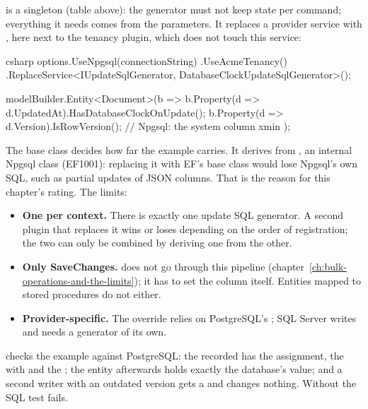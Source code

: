  is a singleton (table above): the
generator must not keep state per command; everything it needs comes from the parameters. It
replaces a provider service with , here next to the tenancy
plugin, which does not touch this service:

\begin{sourcecode}[Registration]{csharp}
options.UseNpgsql(connectionString)
    .UseAcmeTenancy()
    .ReplaceService<IUpdateSqlGenerator, DatabaseClockUpdateSqlGenerator>();

modelBuilder.Entity<Document>(b =>
{
    b.Property(d => d.UpdatedAt).HasDatabaseClockOnUpdate();
    b.Property(d => d.Version).IsRowVersion();            // Npgsql: the system column xmin
});
\end{sourcecode}

The base class decides how far the example carries. It derives from
, an internal Npgsql
class (EF1001): replacing it with EF's base class would lose Npgsql's own SQL, such as partial
updates of JSON columns. That is the reason for this chapter's rating. The limits:

\begin{itemize}
  \item \textbf{One per context.} There is exactly one update SQL generator. A second plugin
    that replaces it wins or loses depending on the order of registration; the two can only
    be combined by deriving one from the other.
  \item \textbf{Only SaveChanges.}  does not go through this
    pipeline (chapter~\ref{ch:bulk-operations-and-the-limits}); it has to set the column itself.
    Entities mapped to stored procedures do not either.
  \item \textbf{Provider-specific.} The override relies on PostgreSQL's ; SQL
    Server writes  and needs a generator of its own.
\end{itemize}

 checks the example against PostgreSQL: the
recorded  has the assignment, the  with  and the
; the entity afterwards holds exactly the database's value; and a second writer
with an outdated version gets a 
and changes nothing. Without  the SQL test fails.

